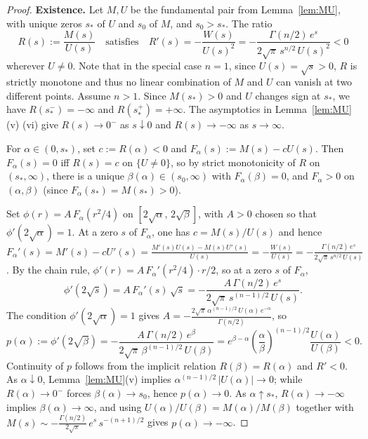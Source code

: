 \documentclass[11pt]{article}
\numberwithin{equation}{section}
\theoremstyle{definition}
\begin{document}
\begin{proof}
{\bf Existence.} Let $M,U$ be the fundamental pair from Lemma~\ref{lem:MU}, with unique zeros $s_*$ of $U$ and $s_0$ of $M$, and $s_0> s_*$. The ratio
\begin{equation} \label{eq:R'sign}
R(s):=\frac{M(s)}{U(s)}\quad\text{satisfies}\quad R'(s)=-\frac{W(s)}{U(s)^2}=-\frac{\Gamma(n/2)\,e^s}{2\sqrt{\pi}\,s^{n/2}\,U(s)^2}<0
\end{equation}
wherever $U\neq0$. Note that in the special case $n=1$, since $U(s)=\sqrt{s}>0$, $R$ is strictly monotone and thus no linear combination of $M$ and $U$ can vanish at two different points. 
Assume $n>1$. Since $M(s_*)>0$ and $U$ changes sign at $s_*$, we have $R(s_*^-)=-\infty$ and $R(s_*^+)=+\infty$. The asymptotics in Lemma~\ref{lem:MU}(v) (vi) give $R(s)\to 0^-$ as $s\downarrow 0$ and $R(s)\to-\infty$ as $s\to\infty$.

For $\alpha\in(0,s_*)$, set $c:=R(\alpha)<0$ and $F_\alpha(s):=M(s)-cU(s)$. Then $F_\alpha(s)=0$ iff $R(s)=c$ on $\{U\neq0\}$, so by strict monotonicity of $R$ on $(s_*,\infty)$, there is a unique $\beta(\alpha)\in(s_0,\infty)$ with $F_\alpha(\beta)=0$, and $F_\alpha>0$ on $(\alpha,\beta)$ (since $F_\alpha(s_*)=M(s_*)>0$).

Set $\phi(r)=A\,F_\alpha(r^2/4)$ on $[2\sqrt{\alpha},\,2\sqrt{\beta}]$, with $A>0$ chosen so that $\phi'(2\sqrt{\alpha})=1$. At a zero $s$ of $F_\alpha$, one has $c=M(s)/U(s)$ and hence
$F_\alpha'(s)=M'(s)-cU'(s)=\frac{M'(s)U(s)-M(s)U'(s)}{U(s)}=-\frac{W(s)}{U(s)}=-\frac{\Gamma(n/2)\,e^s}{2\sqrt{\pi}\,s^{n/2}\,U(s)}$.
By the chain rule, $\phi'(r)=A\,F_\alpha'(r^2/4)\cdot r/2$, so at a zero $s$ of $F_\alpha$,
\[
\phi'(2\sqrt{s})=A\,F_\alpha'(s)\,\sqrt{s}=-\frac{A\,\Gamma(n/2)\,e^s}{2\sqrt{\pi}\,s^{(n-1)/2}\,U(s)}.
\]
The condition $\phi'(2\sqrt{\alpha})=1$ gives
$A=-\frac{2\sqrt{\pi}\,\alpha^{(n-1)/2}\,U(\alpha)\,e^{-\alpha}}{\Gamma(n/2)}$, so
\[
p(\alpha):=\phi'(2\sqrt{\beta})=-\frac{A\,\Gamma(n/2)\,e^\beta}{2\sqrt{\pi}\,\beta^{(n-1)/2}\,U(\beta)}=e^{\beta-\alpha}\!\left(\frac{\alpha}{\beta}\right)^{\!(n-1)/2}\!\frac{U(\alpha)}{U(\beta)}<0.
\]
Continuity of $p$ follows from the implicit relation $R(\beta)=R(\alpha)$ and $R'<0$. As $\alpha\downarrow0$, Lemma~\ref{lem:MU}(v) implies $\alpha^{(n-1)/2}\,|U(\alpha)|\to0$; while $R(\alpha)\to0^-$ forces $\beta(\alpha)\to s_0$, hence $p(\alpha)\to0$. As $\alpha\uparrow s_*$, $R(\alpha)\to-\infty$ implies $\beta(\alpha)\to\infty$, and using $U(\alpha)/U(\beta)=M(\alpha)/M(\beta)$ together with $M(s)\sim -\frac{\Gamma(n/2)}{2\sqrt{\pi}}\,e^{s}\,s^{-(n+1)/2}$ gives $p(\alpha)\to-\infty$.


\end{proof}
\end{document}
